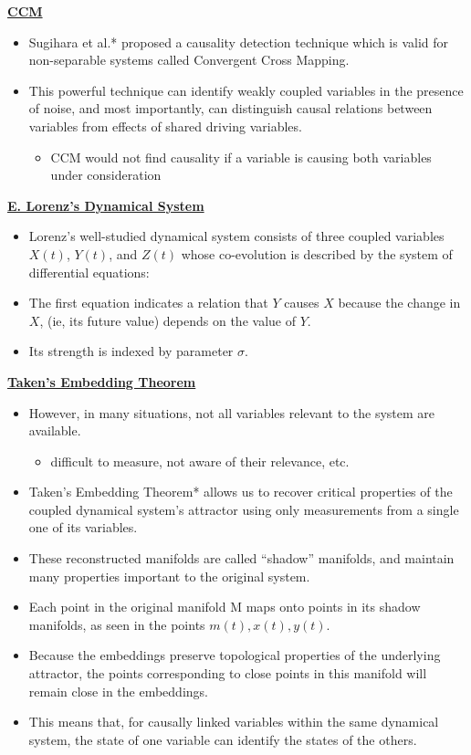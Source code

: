 \documentclass[10pt,a4paper]{article}
\begin{document}
\noindent\underline{\textbf{CCM}}
\begin{itemize}
\item Sugihara et al.* proposed a causality detection technique which is valid for non-separable systems called Convergent Cross Mapping. 
\item This powerful technique can identify weakly coupled variables in the presence of noise, and most importantly, can distinguish causal relations between variables from effects of shared driving variables.
\begin{itemize}
\item CCM would not find causality if a variable is causing both variables under consideration
\end{itemize}
\end{itemize}
\noindent\underline{\textbf{E. Lorenz's Dynamical System}}
\begin{itemize}
\item Lorenz’s well-studied dynamical system consists of three coupled variables $X(t)$, $Y(t)$, and $Z(t)$ whose co-evolution is described by the system of differential equations:
\end{itemize}
\begin{itemize}
\item The first equation indicates a relation that $Y$ causes $X$ because the change in $X$, (ie, its future value) depends on the value of $Y$.
\item Its strength is indexed by parameter $\sigma$.
\end{itemize}
\noindent\underline{\textbf{Taken's Embedding Theorem}}
\begin{itemize}
\item However, in many situations, not all variables relevant to the system are available.
\begin{itemize}
\item difficult to measure, not aware of their relevance, etc.
\end{itemize}

\item Taken’s Embedding Theorem* allows us to recover critical properties of the coupled dynamical system’s attractor using only measurements from a single one of its variables.
\item These reconstructed manifolds are called “shadow” manifolds, and maintain many properties important to the original system.

\item Each point in the original manifold M maps onto points in its shadow manifolds, as seen in the points $m(t), x(t), y(t)$. 
\item Because the embeddings preserve topological properties of the underlying attractor, the points corresponding to close points in this manifold will remain close in the embeddings.
\item This means that, for causally linked variables within the same dynamical system, the state of one variable can identify the states of the others.
\end{itemize}
\end{document}
